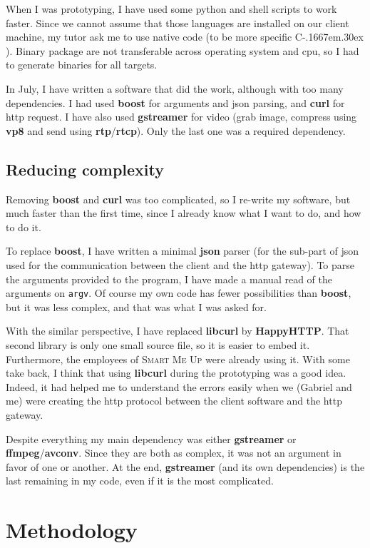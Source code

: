 \documentclass[a4paper,11pt]{custom}
\newcommand{\smu}{\textsc{Smart Me Up}\xspace}
\newcommand{\rtp}{\textbf{rtp}\xspace}
\newcommand{\rtcp}{\textbf{rtcp}\xspace}
\newcommand{\avconv}{\textbf{avconv}\xspace}
\newcommand{\ffmpeg}{\textbf{ffmpeg}\xspace}
\newcommand{\gstreamer}{\textbf{gstreamer}\xspace}
\newcommand{\curl}{\textbf{curl}\xspace}
\newcommand{\boost}{\textbf{boost}\xspace}
\newcommand{\happyhttp}{\textbf{HappyHTTP}\xspace}
\newcommand{\libcurl}{\textbf{libcurl}\xspace}
\newcommand{\vpx}{\textbf{vp8}\xspace}
\newcommand{\cpp}{%
  C\kern-.1667em\raise.30ex\hbox{\smaller{++}}%
  \spacefactor1000\xspace%
}
\newcommand{\json}{\textbf{json}\xspace}
\begin{document}
When I was prototyping, I have used some python and shell scripts to work
faster. Since we cannot assume that those languages are installed on our client
machine, my tutor ask me to use native code (to be more specific \cpp). Binary
package are not transferable across operating system and cpu, so I had to
generate binaries for all targets.

In July, I have written a software that did the work, although with too many
dependencies. I had used \boost{} for arguments and json parsing, and \curl{}
for http request. I have also used \gstreamer{} for video (grab image, compress
using \vpx{} and send using \rtp/\rtcp). Only the last one was a required
dependency.

\subsection{Reducing complexity}
\label{sec:complexity}

Removing \boost{} and \curl{} was too complicated, so I re-write my software,
but much faster than the first time, since I already know what I want to do, and
how to do it.

To replace \boost{}, I have written a minimal \json{} parser (for the sub-part of
json used for the communication between the client and the http gateway).
To parse the arguments provided to the program, I have made a manual read of
the arguments on \verb+argv+. Of course my own code has fewer possibilities than
\boost{}, but it was less complex, and that was what I was asked for.

With the similar perspective, I have replaced \libcurl{} by \happyhttp. That second
library is only one small source file, so it is easier to embed it. Furthermore,
the employees of \smu{} were already using it. With some take back, I think that
using \libcurl{} during the prototyping was a good idea. Indeed, it had helped me to
understand the errors easily when we (Gabriel and me) were creating the http
protocol between the client software and the http gateway.

Despite everything my main dependency was either \gstreamer{} or
\ffmpeg/\avconv. Since they are both as complex, it was not an argument in
favor of one or another. At the end, \gstreamer{} (and its own dependencies) is
the last remaining in my code, even if it is the most complicated.

\section{Methodology}
\end{document}
